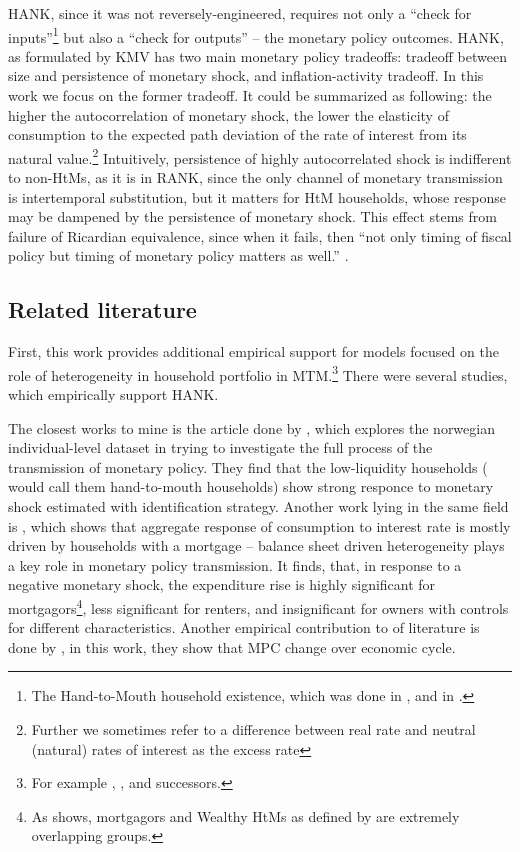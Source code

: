 \documentclass[12pt]{article}
\begin{document}
HANK, since it was not reversely-engineered, requires not only a ``check for inputs''\footnote{The Hand-to-Mouth household existence, which was done in  \citet{KVW2014}, and in \citet{Cloyne2019}.} but also a ``check for outputs'' -- the monetary policy outcomes.
HANK, as formulated by KMV has two main monetary policy tradeoffs:
tradeoff between size and persistence of monetary shock, and inflation-activity tradeoff.
In this work we focus on the former tradeoff.
It could be summarized as following: the higher the autocorrelation of monetary shock, the lower the elasticity of consumption to the expected path deviation of the rate of interest from its natural value.\footnote{Further we sometimes  refer to a difference between real rate and neutral (natural) rates of interest as the excess rate}
Intuitively, persistence of highly autocorrelated shock is indifferent to non-HtMs, as it is in RANK, since the only channel of monetary transmission is intertemporal substitution, but it matters for HtM households, whose response may be dampened by the persistence of monetary shock. 
This effect stems from failure of Ricardian equivalence, since when it fails, then ``not only timing of fiscal policy but timing of monetary policy matters as well.'' \cite{KMV2018}. 





\subsection{Related literature}


First, this work provides additional empirical support for models focused on the role of heterogeneity in household portfolio in MTM.\footnote{For example \citet{KMV2018}, \citet{Auclert2019}, \citet{Luetticke2021} and successors.}
There were several studies, which empirically support HANK. 

The closest works to mine is the article done by \citet{HolmPaulTischbirek2020}, which explores the norwegian individual-level dataset in trying to investigate the full process of the transmission of monetary policy.
They find that the low-liquidity households (\citeauthor{KMV2018} would call them hand-to-mouth households) show strong responce to monetary shock estimated with \cite{RomerRomer2004} identification strategy.
Another work lying in the same field is \citet{Cloyne2019}, which  shows that aggregate response of consumption to interest rate is mostly driven by households with a mortgage -- balance sheet driven heterogeneity plays a key role in monetary policy transmission.
It finds, that, in response to a negative monetary shock, the expenditure rise is highly significant for mortgagors\footnote{As \citet{Cloyne2019} shows, mortgagors and Wealthy HtMs as defined by \citet{KVW2014} are extremely overlapping groups.}, less significant for renters, and insignificant for owners with controls for different characteristics.
Another empirical contribution to of literature is done by \citet{Gross2020}, in this work, they show that MPC change over economic cycle.
\end{document}
